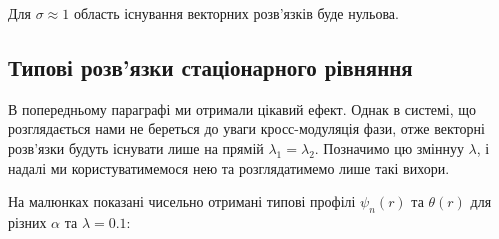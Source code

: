Для $\sigma\approx1$ область існування векторних розв'язків буде нульова. 

\subsection{Типові розв'язки стаціонарного рівняння}
\hspace*{8mm} В попередньому параграфі ми отримали цікавий ефект. Однак в системі, що розглядається нами не береться до уваги кросс-модуляція фази, отже векторні розв'язки будуть існувати лише на прямій $\lambda_1=\lambda_2$. Позначимо цю зміннуу $\lambda$, і надалі ми користуватимемося нею та розглядатимемо лише такі вихори.

На малюнках показані чисельно отримані типові профілі $\psi_n(r)$ та $\theta(r)$ для різних $\alpha$ та $\lambda=0.1$:

